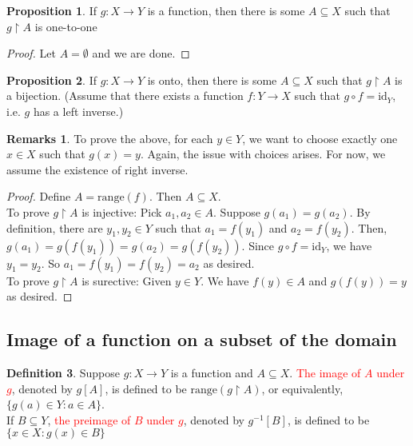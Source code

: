 \documentclass[14pt]{article}
\theoremstyle{definition}
\newtheorem*{remark}{Remarks}
\newtheorem{definition}{Definition}[subsection]
\newtheorem{proposition}[definition]{Proposition}
\begin{document}
\vspace{1mm} %

\begin{proposition}
    If $g\colon X\rightarrow Y$ is a function, then there is some $A\subseteq X$ such that $g\upharpoonright A$ is one-to-one
\end{proposition}
\begin{proof}
    Let $A=\emptyset$ and we are done.
\end{proof}

\vspace{1mm} %

\begin{proposition}
    If $g\colon X\rightarrow Y$ is onto, then there is some $A\subseteq X $ such that $g\upharpoonright A$ is a bijection.  (Assume that there exists a function $f\colon Y\rightarrow X$ such that $g\circ f=\mathrm{id}_Y$, i.e. $g$ has a left inverse.) 
\end{proposition}
\begin{remark}
    To prove the above, for each $y\in Y$, we want to choose exactly one $x\in X$ such that $g(x)=y$. Again, the issue with choices arises. For now, we assume the existence of right inverse.
\end{remark}

\begin{proof}
    Define $A=\mathrm{range}(f)$. Then $A \subseteq X$.\\
    To prove $g\upharpoonright A$ is injective: Pick $a_1, a_2\in A$. Suppose $g(a_1)=g(a_2)$. By definition, there are $y_1,y_2\in Y$ such that $a_1=f(y_1)$ and $a_2=f(y_2)$. Then, $g(a_1)=g(f(y_1))=g(a_2)=g(f(y_2))$. Since $g\circ f=\mathrm{id}_Y$, we have $y_1=y_2$. So $a_1=f(y_1)=f(y_2)=a_2$ as desired.\\
    To prove $g\upharpoonright A$ is surective: Given $y\in Y$. We have $f(y)\in A$ and $g(f(y))=y$ as desired.
\end{proof}

\vspace{5mm} %

\subsection{Image of a function on a subset of the domain}

\begin{definition}
   Suppose $g\colon X\rightarrow Y$ is a function and $A\subseteq X$. \textcolor{red}{The image of $A$ under $g$}, denoted by $g[A]$, is defined to be $\mathrm{range}(g\upharpoonright A)$, or equivalently, $\{g(a)\in Y\colon a\in A\}$.\\
   If $B\subseteq Y$, \textcolor{red}{the preimage of $B$ under $g$}, denoted by $g^{-1}[B]$, is defined to be $\{x\in X\colon g(x)\in B\}$
\end{definition}
\end{document}
